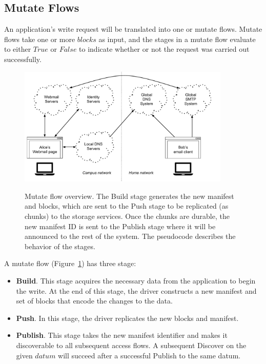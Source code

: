 \subsection{Mutate Flows}

An application's write request will be translated into one or mutate flows.
Mutate flows take one or more $blocks$ as input, and the stages in a mutate flow
evaluate to either $True$ or $False$ to indicate whether or not the request was
carried out successfully.

\begin{figure}[h]
   \caption{Mutate flow overview.  The Build stage generates the new manifest
   and blocks, which are sent to the Push stage to be replicated (as chunks) to
   the storage services.  Once the chunks are durable, the new manifest ID is
   sent to the Publish stage where it will be announced to the rest of the
   system.  The pseudocode describes the behavior of the stages.}
   \centering
   \includegraphics[width=0.9\textwidth,page=8]{figures/dissertation-figures}
   \label{fig:chap2-mutate-flow}
\end{figure}

A mutate flow (Figure~\ref{fig:chap2-mutate-flow}) has three stage:

\begin{itemize}
    \item \textbf{Build}.  This stage acquires the necessary data from the
application to begin the write.  At the end of this stage, the driver constructs
a new manifest and set of blocks that encode the changes to the data. 
    \item \textbf{Push}.  In this stage, the driver replicates the new blocks and
manifest.
    \item \textbf{Publish}.  This stage takes the new manifest identifier and makes
it discoverable to all subsequent access flows.  A subsequent Discover on the
given $datum$ will succeed after a successful Publish to the same datum.
\end{itemize}

